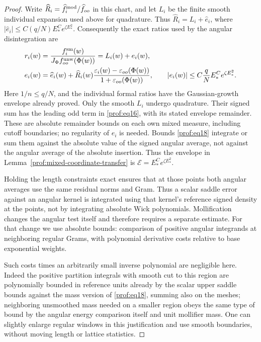 \begin{proof}
Write \(\widehat R_i=\widehat f_i^{\rm mod}/\widehat f_{oo}\)
in this chart, and let \(L_i\) be the finite smooth individual
expansion used above for quadrature. Thus
\(\widehat R_i=L_i+\widehat e_i\), where
\(|\widehat e_i|\le C(q/N)E_*^C e^{\zeta E_*^2}\).
Consequently the exact ratios used by the angular disintegration are
\[
 \begin{split}
 r_i(w)&=\frac{f_i^{\rm sm}(w)}
                 {J_\Phi f_{oo}^{\rm unw}(\Phi(w))}
          =L_i(w)+e_i(w),\\
 e_i(w)&=\widehat e_i(w)+\widehat R_i(w)
      \frac{\varepsilon_i(w)-\varepsilon_{oo}(\Phi(w))}
           {1+\varepsilon_{oo}(\Phi(w))},\qquad
 |e_i(w)|\le C\frac qN E_*^C e^{\zeta E_*^2}.
 \end{split}
\]
Here \(1/n\le q/N\), and the individual formal ratios have
the Gaussian-growth envelope already proved. Only the smooth
\(L_i\) undergo quadrature. Their signed sum has the leading
odd term in \eqref{prof:eq16}, with its stated envelope remainder.
These are absolute remainder bounds on each
own mixed measure, including cutoff boundaries; no regularity of
\(e_i\) is needed. Bounds \eqref{prof:eq18} integrate or sum them
against the absolute value of the signed angular average, not
against the angular average of the absolute insertion.
Thus the envelope in Lemma~\ref{prof:mixed-coordinate-transfer}
is \(\mathscr E=E_*^C e^{\zeta E_*^2}\).

Holding the length constraints exact ensures that at those points both angular averages use the same residual norms and Gram. Thus a scalar saddle error against an angular kernel is integrated using that kernel's reference signed density at the points, not by integrating absolute Wick polynomials. Mollification changes the angular test itself and therefore requires
a separate estimate. For that change we use absolute bounds: comparison of positive angular integrands at neighboring regular Grams, with polynomial derivative costs relative to base exponential weights.

Such costs times an arbitrarily small inverse polynomial are negligible here. Indeed the positive partition integrals with smooth cut to this region are polynomially bounded in reference units already by the scalar upper saddle bounds against the mass version of \eqref{prof:eq18}, summing also on the meshes; neighboring unsmoothed mass needed on a smaller region obeys the same type of bound by the angular energy comparison itself and unit mollifier mass. One can slightly enlarge regular windows in this justification and use smooth boundaries, without moving length or lattice statistics.


\end{proof}
